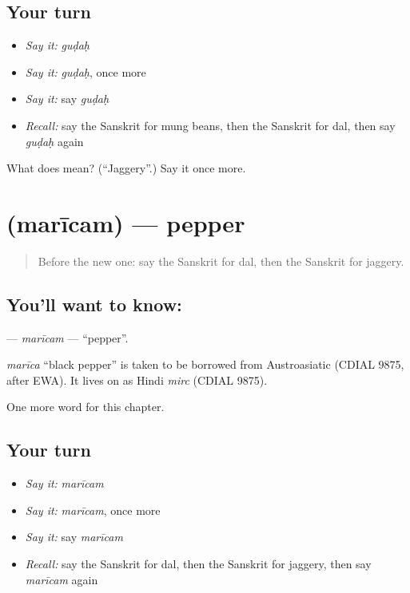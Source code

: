 \subsection*{Your turn}
\begin{itemize}
\raggedright
  \item \emph{Say it:} \emph{guḍaḥ}
  \item \emph{Say it:} \emph{guḍaḥ}, once more
  \item \emph{Say it:} say \emph{guḍaḥ}
  \item \emph{Recall:} say the Sanskrit for mung beans, then the Sanskrit for dal, then say \emph{guḍaḥ} again
\end{itemize}

\begin{tcolorbox}[breakable,colback=teal!4,colframe=teal!35!black,title={Before you move on}]
What does  mean? (\textquotedblleft{}Jaggery\textquotedblright{}.) Say it once more.
\end{tcolorbox}
\section[\texorpdfstring{\sk{मरीचम्} (marīcam)}{मरीचम् (marīcam)}]{ (marīcam) — pepper}

\label{lesson:SA-C107-maricam}



\begin{quote}
Before the new one: say the Sanskrit for dal, then the Sanskrit for jaggery.
\end{quote}

\subsection*{You'll want to know: }
\textbf{} — \emph{marīcam} — \textquotedblleft{}pepper\textquotedblright{}.

\begin{cousinweb}
\emph{marīca} \textquotedblleft{}black pepper\textquotedblright{} is taken to be borrowed from Austroasiatic (CDIAL 9875, after EWA). It lives on as Hindi \emph{mirc} (CDIAL 9875).
\end{cousinweb}

\begin{grammarlens}[title={What you've built}]
One more word for this chapter.
\end{grammarlens}

\subsection*{Your turn}
\begin{itemize}
\raggedright
  \item \emph{Say it:} \emph{marīcam}
  \item \emph{Say it:} \emph{marīcam}, once more
  \item \emph{Say it:} say \emph{marīcam}
  \item \emph{Recall:} say the Sanskrit for dal, then the Sanskrit for jaggery, then say \emph{marīcam} again
\end{itemize}

